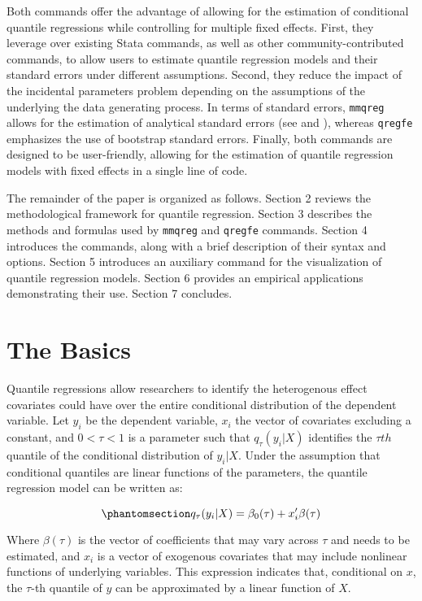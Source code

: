 \documentclass[bib]{statapress}
\begin{document}
Both commands offer the advantage of allowing for the estimation of
conditional quantile regressions while controlling for multiple fixed
effects. First, they leverage over existing Stata commands, as well as
other community-contributed commands, to allow users to estimate
quantile regression models and their standard errors under different
assumptions. Second, they reduce the impact of the incidental parameters
problem depending on the assumptions of the underlying the data
generating process. In terms of standard errors, \texttt{mmqreg} allows
for the estimation of analytical standard errors (see \citet{mss2019}
and \citet{riosavila2024}), whereas \texttt{qregfe} emphasizes the use
of bootstrap standard errors. Finally, both commands are designed to be
user-friendly, allowing for the estimation of quantile regression models
with fixed effects in a single line of code.

The remainder of the paper is organized as follows. Section 2 reviews
the methodological framework for quantile regression. Section 3
describes the methods and formulas used by \texttt{mmqreg} and
\texttt{qregfe} commands. Section 4 introduces the commands, along with
a brief description of their syntax and options. Section 5 introduces an
auxiliary command for the visualization of quantile regression models.
Section 6 provides an empirical applications demonstrating their use.
Section 7 concludes.

\section{The Basics}\label{sec-basics}

Quantile regressions allow researchers to identify the heterogenous
effect covariates could have over the entire conditional distribution of
the dependent variable. Let \(y_i\) be the dependent variable, \(x_i\)
the vector of covariates excluding a constant, and \(0<\tau<1\) is a
parameter such that \(q_\tau(y_i|X)\) identifies the \(\tau th\)
quantile of the conditional distribution of \(y_i|X\). Under the
assumption that conditional quantiles are linear functions of the
parameters, the quantile regression model can be written as:

\begin{equation}\phantomsection\label{eq-qr}{q_\tau(y_i|X)=\beta_0(\tau) + x_i'\beta(\tau)
}\end{equation}

Where \(\beta(\tau)\) is the vector of coefficients that may vary across
\(\tau\) and needs to be estimated, and \(x_i\) is a vector of exogenous
covariates that may include nonlinear functions of underlying variables.
This expression indicates that, conditional on \(x\), the \(\tau\)-th
quantile of \(y\) can be approximated by a linear function of \(X\).
\end{document}

